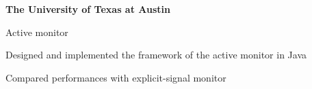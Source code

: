 

\begin{myexp}
\item \textbf{The University of Texas at Austin}   
    \begin{myexp}
    \item Active monitor
        \begin{mybullet}
            \item Designed and implemented the framework of the active 
                monitor in Java
            \item Compared performances with explicit-signal monitor
        \end{mybullet}


\end{myexp}
\end{myexp}
